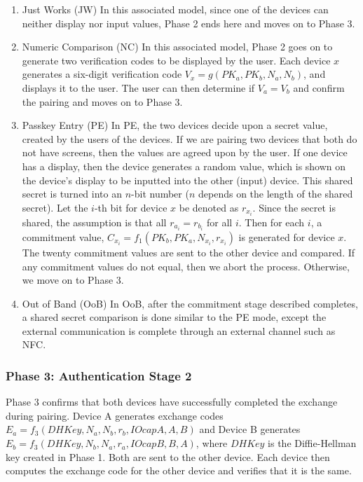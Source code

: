 \documentclass{acm_proc_article-sp}
\begin{document}
\begin{enumerate}[1.]
    \item{Just Works (JW)} In this associated model, since one of the devices can neither display nor input values, Phase 2 ends here and moves on to Phase 3.
    \item{Numeric Comparison (NC)} In this associated model, Phase 2 goes on to generate two verification codes to be displayed by the user. Each device $x$ generates a six-digit verification code $V_x = g(PK_a, PK_b, N_a, N_b)$, and displays it to the user. The user can then determine if $V_a = V_b$ and confirm the pairing and moves on to Phase 3.
    \item{Passkey Entry (PE)} In PE, the two devices decide upon a secret value, created by the users of the devices. If we are pairing two devices that both do not have screens, then the values are agreed upon by the user. If one device has a display, then the device generates a random value, which is shown on the device's display to be inputted into the other (input) device. This shared secret is turned into an $n$-bit number ($n$ depends on the length of the shared secret). Let the $i$-th bit for device $x$ be denoted as $r_{x_i}$. Since the secret is shared, the assumption is that all $r_{a_i} = r_{b_i}$ for all $i$. Then for each $i$, a commitment value, $C_{x_i} = f_1(PK_b, PK_a, N_{x_i}, r_{x_i})$ is generated for device $x$. The twenty commitment values are sent to the other device and compared. If any commitment values do not equal, then we abort the process. Otherwise, we move on to Phase 3.
    \item{Out of Band (OoB)} In OoB, after the commitment stage described completes, a shared secret comparison is done similar to the PE mode, except the external communication is complete through an external channel such as NFC.
\end{enumerate}

\subsubsection{Phase 3: Authentication Stage 2}
Phase 3 confirms that both devices have successfully completed the exchange during pairing. Device A generates exchange codes $E_a = f_3(DHKey, N_a, N_b, r_b, IOcapA, A, B)$ and Device B generates $E_b = f_3(DHKey, N_b, N_a, r_a, IOcapB, B, A)$, where $DHKey$ is the Diffie-Hellman key created in Phase 1. Both are sent to the other device. Each device then computes the exchange code for the other device and verifies that it is the same.
\end{document}
